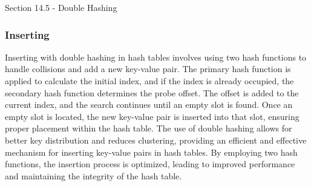 \begin{notes}{Section 14.5 - Double Hashing}
    \subsubsection*{Inserting}
    
    Inserting with double hashing in hash tables involves using two hash functions to handle collisions and add a new key-value pair. The primary hash function is applied to calculate the initial index, and if the 
    index is already occupied, the secondary hash function determines the probe offset. The offset is added to the current index, and the search continues until an empty slot is found. Once an empty slot is located, 
    the new key-value pair is inserted into that slot, ensuring proper placement within the hash table. The use of double hashing allows for better key distribution and reduces clustering, providing an efficient and 
    effective mechanism for inserting key-value pairs in hash tables. By employing two hash functions, the insertion process is optimized, leading to improved performance and maintaining the integrity of the hash table.
\end{notes}

